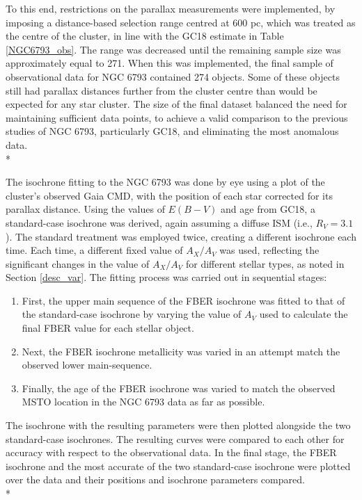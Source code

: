 \documentclass[12pt, a4paper]{report}
\begin{document}
To this end, restrictions on the parallax measurements were implemented, by imposing a distance-based selection range centred at 600 pc, which was treated as the centre of the cluster, in line with the GC18 estimate in Table \ref{NGC6793_obs}. The range was decreased until the remaining sample size was approximately equal to 271. When this was implemented, the final sample of observational data for NGC 6793 contained 274 objects. Some of these objects still had parallax distances further from the cluster centre than would be expected for any star cluster. The size of the final dataset balanced the need for maintaining sufficient data points, to achieve a valid comparison to the previous studies of NGC 6793, particularly GC18, and eliminating the most anomalous data.\\*

The isochrone fitting to the NGC 6793 was done by eye using a plot of the cluster's observed Gaia CMD, with the position of each star corrected for its parallax distance. Using the values of $E(B-V)$ and age from GC18, a standard-case isochrone was derived, again assuming a diffuse ISM (i.e., $R_{V} = 3.1$). The standard treatment was employed twice, creating a different isochrone each time. Each time, a different fixed value of $A_{X}/A_{V}$ was used, reflecting the significant changes in the value of $A_{X}/A_{V}$ for different stellar types, as noted in Section \ref{desc_var}. The fitting process was carried out in sequential stages:

\begin{enumerate}
\item First, the upper main sequence of the FBER isochrone was fitted to that of the standard-case isochrone by varying the value of $A_{V}$ used to calculate the final FBER value for each stellar object.
\item Next, the FBER isochrone metallicity was varied in an attempt match the observed lower main-sequence.
\item Finally, the age of the FBER isochrone was varied to match the observed MSTO location in the NGC 6793 data as far as possible.

\end{enumerate}

The isochrone with the resulting parameters were then plotted alongside the two standard-case isochrones. The resulting curves were compared to each other for accuracy with respect to the observational data. In the final stage, the FBER isochrone and the most accurate of the two standard-case isochrone were plotted over the data and their positions and isochrone parameters compared.\\*
\end{document}
